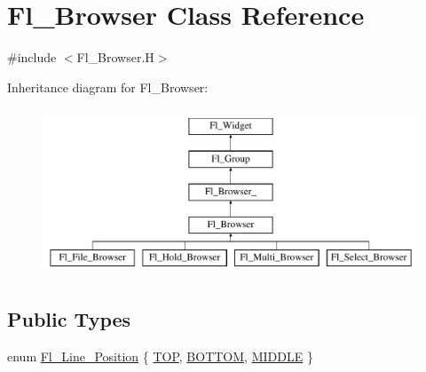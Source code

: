 \hypertarget{class_fl___browser}{}\section{Fl\+\_\+\+Browser Class Reference}
\label{class_fl___browser}


{\ttfamily \#include $<$Fl\+\_\+\+Browser.\+H$>$}

Inheritance diagram for Fl\+\_\+\+Browser\+:\begin{figure}[H]
\begin{center}
\leavevmode
\includegraphics[height=5.000000cm]{class_fl___browser}
\end{center}
\end{figure}
\subsection*{Public Types}
\begin{DoxyCompactItemize}
\item 
enum \hyperlink{class_fl___browser_a1baffc4660ee0f5c8f3d86a7373b854a}{Fl\+\_\+\+Line\+\_\+\+Position} \{ \hyperlink{class_fl___browser_a1baffc4660ee0f5c8f3d86a7373b854aa5bec728f0672e1923c2747666d03ddd0}{T\+OP}, 
\hyperlink{class_fl___browser_a1baffc4660ee0f5c8f3d86a7373b854aaf8a15f7a78aafa7e7bdc5f62d5a05849}{B\+O\+T\+T\+OM}, 
\hyperlink{class_fl___browser_a1baffc4660ee0f5c8f3d86a7373b854aa7679f29cba85b55b84aebdf0c70e57c2}{M\+I\+D\+D\+LE}
 \}
\end{DoxyCompactItemize}

